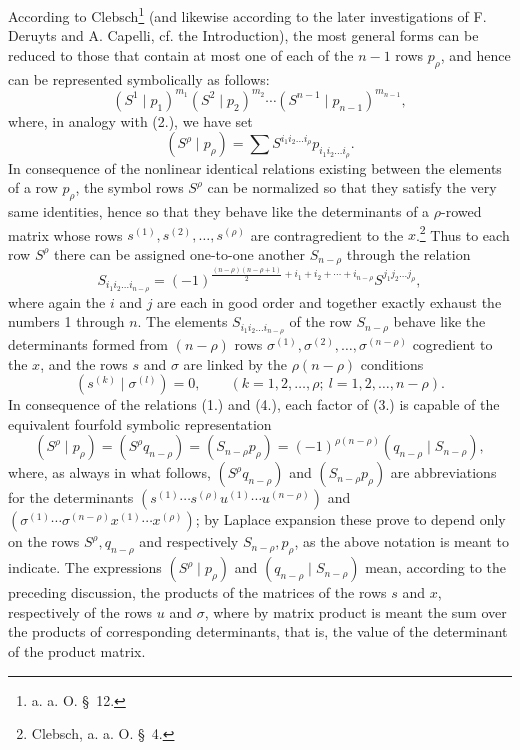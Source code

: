 \documentclass[11pt]{article}
\begin{document}
According to Clebsch\footnote{a. a. O. \S\ 12.} (and likewise according to the later investigations of F. Deruyts and A. Capelli, cf. the Introduction), the most general forms can be reduced to those that contain at most one of each of the $n-1$ rows $p_\rho$, and hence can be represented symbolically as follows:
\begin{equation}
 (S^1\mid p_1)^{m_1}(S^2\mid p_2)^{m_2}\cdots(S^{n-1}\mid p_{n-1})^{m_{n-1}},
\tag{3}
\end{equation}
where, in analogy with (2.), we have set
\[
 (S^\rho\mid p_\rho)=\sum S^{i_1i_2\ldots i_\rho}p_{i_1i_2\ldots i_\rho}.
\]
In consequence of the nonlinear identical relations existing between the elements of a row $p_\rho$, the symbol rows $S^\rho$ can be normalized so that they satisfy the very same identities, hence so that they behave like the determinants of a $\rho$-rowed matrix whose rows $s^{(1)},s^{(2)},\ldots,s^{(\rho)}$ are contragredient to the $x$.\footnote{Clebsch, a. a. O. \S\ 4.} Thus to each row $S^\rho$ there can be assigned one-to-one another $S_{n-\rho}$ through the relation
\begin{equation}
 S_{i_1i_2\ldots i_{n-\rho}}=(-1)^{\frac{(n-\rho)(n-\rho+1)}2+i_1+i_2+\cdots+i_{n-\rho}}S^{j_1j_2\ldots j_\rho},
\tag{4}
\end{equation}
where again the $i$ and $j$ are each in good order and together exactly exhaust the numbers 1 through $n$. The elements $S_{i_1i_2\ldots i_{n-\rho}}$ of the row $S_{n-\rho}$ behave like the determinants formed from $(n-\rho)$ rows $\sigma^{(1)},\sigma^{(2)},\ldots,\sigma^{(n-\rho)}$ cogredient to the $x$, and the rows $s$ and $\sigma$ are linked by the $\rho(n-\rho)$ conditions
\begin{equation}
 (s^{(k)}\mid \sigma^{(l)})=0,\qquad(k=1,2,\ldots,\rho;\ l=1,2,\ldots,n-\rho).
\tag{5}
\end{equation}
In consequence of the relations (1.) and (4.), each factor of (3.) is capable of the equivalent fourfold symbolic representation
\begin{equation}
 (S^\rho\mid p_\rho)=(S^\rho q_{n-\rho})=(S_{n-\rho}p_\rho)=(-1)^{\rho(n-\rho)}(q_{n-\rho}\mid S_{n-\rho}),
\tag{6}
\end{equation}
where, as always in what follows, $(S^\rho q_{n-\rho})$ and $(S_{n-\rho}p_\rho)$ are abbreviations for the determinants $(s^{(1)}\cdots s^{(\rho)}u^{(1)}\cdots u^{(n-\rho)})$ and $(\sigma^{(1)}\cdots\sigma^{(n-\rho)}x^{(1)}\cdots x^{(\rho)})$; by Laplace expansion these prove to depend only on the rows $S^\rho,q_{n-\rho}$ and respectively $S_{n-\rho},p_\rho$, as the above notation is meant to indicate. The expressions $(S^\rho\mid p_\rho)$ and $(q_{n-\rho}\mid S_{n-\rho})$ mean, according to the preceding discussion, the products of the matrices of the rows $s$ and $x$, respectively of the rows $u$ and $\sigma$, where by matrix product is meant the sum over the products of corresponding determinants, that is, the value of the determinant of the product matrix.
\end{document}
